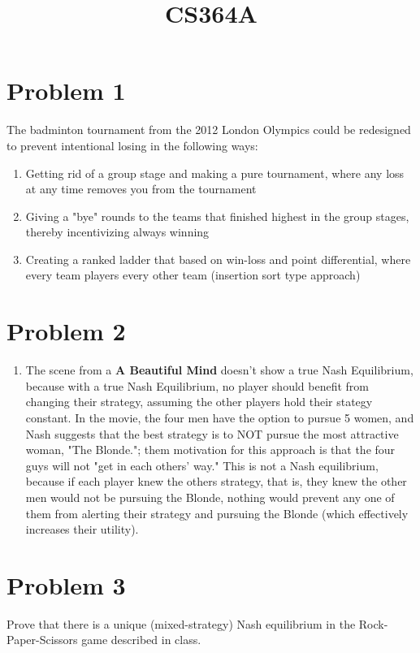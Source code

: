 \documentclass{article}
\title{CS364A \exerciseset}
\author{\studentname}
\begin{document}
\maketitle

\section*{Problem 1}
The badminton tournament from the 2012 London Olympics could be redesigned to
prevent intentional losing in the following ways:

\begin{enumerate}
\item Getting rid of a group stage and making a pure tournament, where any
	loss at any time removes you from the tournament 
\item Giving a "bye" rounds to the teams that finished highest in the
		group stages, thereby incentivizing always winning
\item Creating a ranked ladder that based on win-loss and point differential, where every team players every other team (insertion sort type approach)
\end{enumerate}


\section*{Problem 2}
\begin{enumerate}
\item %
	The scene from a \textbf{A Beautiful Mind} doesn't show a true Nash Equilibrium,
		because with a true Nash Equilibrium, no player should benefit from
		changing their strategy, assuming the other players hold their stategy
		constant. In the movie, the four men have the
		option to pursue 5 women, and Nash suggests that the
		best strategy is to NOT pursue the most attractive woman, "The
		Blonde."; them motivation for this approach is that the four guys will
		not "get in each others' way." This is not a Nash equilibrium, because if each
		player knew the others strategy, that is, they knew the other men
		would not be pursuing the Blonde, nothing would prevent any one of them
		from alerting their strategy and pursuing the Blonde (which
		effectively increases their utility).

\end{enumerate}

\section*{Problem 3}
Prove that there is a unique (mixed-strategy) Nash equilibrium in the Rock-Paper-Scissors game described in class.
\end{document}
